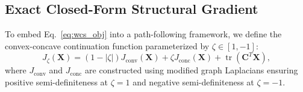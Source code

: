 \documentclass[a4paper,fleqn]{cas-dc}
\theoremstyle{thmstyleone}
\theoremstyle{thmstyletwo}
\theoremstyle{thmstylethree}
\begin{document}
\subsection{Exact Closed-Form Structural Gradient}
To embed Eq.~\eqref{eq:wcs_obj} into a path-following framework, we define the convex-concave continuation function parameterized by $\zeta \in [1, -1]$:
\begin{equation}
J_\zeta(\mathbf{X}) = (1 - |\zeta|) J_{\text{conv}}(\mathbf{X}) + \zeta J_{\text{conc}}(\mathbf{X}) + \operatorname{tr}(\mathbf{C}^T\mathbf{X}),
\label{eq:homotopy}
\end{equation}
where $J_{\text{conv}}$ and $J_{\text{conc}}$ are constructed using modified graph Laplacians ensuring positive semi-definiteness at $\zeta = 1$ and negative semi-definiteness at $\zeta = -1$.
\end{document}
